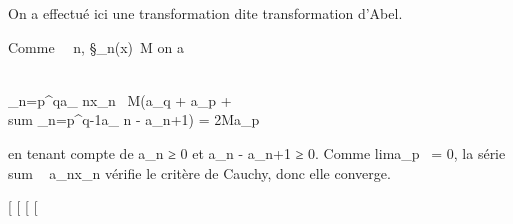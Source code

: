\documentclass[]{article}
\begin{document}
On a effectué ici une transformation dite transformation d'Abel.

Comme \forall~~n,
\S_n(x)\ \leq M
on a

\\\sum
_n=p^qa_
nx_n\ \leq
M(a_q + a_p
+ \\sum
_n=p^q-1a_ n -
a_n+1) = 2Ma_p

en tenant compte de a_n ≥ 0 et a_n - a_n+1 ≥
0. Comme lima_p~ = 0, la série
\\sum ~
a_nx_n vérifie le critère de Cauchy, donc elle
converge.

[
[
[
[
\end{document}
